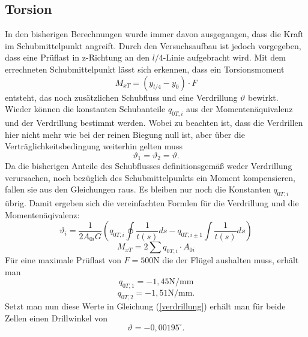\subsection{Torsion}
In den bisherigen Berechnungen wurde immer davon ausgegangen, dass die Kraft im Schubmittelpunkt angreift. Durch den Versuchsaufbau ist jedoch vorgegeben, dass eine Prüflast in z-Richtung an den $l/4$-Linie aufgebracht wird. Mit dem errechneten Schubmittelpunkt lässt sich erkennen, dass ein Torsionsmoment 
\begin{equation}
	M_{xT}=(y_{l/4}-y_{0})\cdot F
\end{equation}
entsteht, das noch zusätzlichen Schubfluss und eine Verdrillung $\vartheta$ bewirkt. Wieder können die konstanten Schubanteile $q_{0T,i}$ aus der Momentenäquivalenz und der Verdrillung bestimmt werden. Wobei zu beachten ist, dass die Verdrillen hier nicht mehr wie bei der reinen Biegung null ist, aber über die Verträglichkeitsbedingung weiterhin gelten muss
\begin{equation}
	\vartheta_{1}=\vartheta_{2}=\vartheta.
\end{equation}
Da die bisherigen Anteile des Schubflusses definitionsgemäß weder Verdrillung verursachen, noch bezüglich des Schubmittelpunkts ein Moment kompensieren, fallen sie aus den Gleichungen raus. Es bleiben nur noch die Konstanten $q_{0T,i}$ übrig. Damit ergeben sich die vereinfachten Formlen für die Verdrillung und die Momentenäqivalenz:
\begin{equation}\label{verdrillung}
	\vartheta_{i} = \frac{1}{2A_{0i}G}(q_{0T,i}\oint\frac{1}{t(s)}ds-q_{0T,i\pm1}\int\frac{1}{t(s)}ds)
\end{equation}
\begin{equation}
		M_{xT}=2\sum q_{0T,i}\cdot A_{0i}
\end{equation}
Für eine maximale Prüflast von $F=500\mathrm{N}$ die der Flügel aushalten muss, erhält man
$$
	q_{0T,1}=-1,45\mathrm{N/mm}
$$
$$
	q_{0T,2}=-1,51\mathrm{N/mm}.
$$
Setzt man nun diese Werte in Gleichung (\ref{verdrillung}) erhält man für beide Zellen einen Drillwinkel von
$$
	\vartheta =-0,00195 ^\circ.
$$

